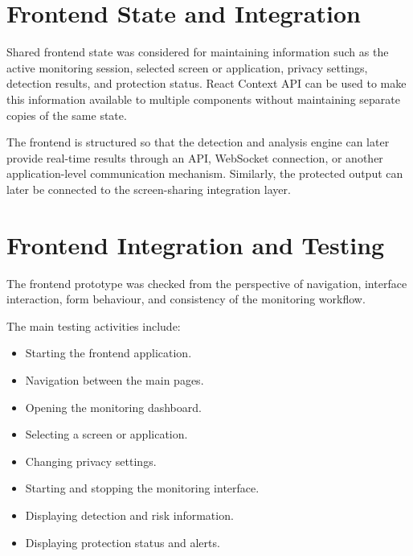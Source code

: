 \documentclass[12pt,a4paper]{article}
\begin{document}

\section{Frontend State and Integration}

Shared frontend state was considered for maintaining information such as the active
monitoring session, selected screen or application, privacy settings, detection results,
and protection status. React Context API can be used to make this information available
to multiple components without maintaining separate copies of the same state.

The frontend is structured so that the detection and analysis engine can later provide
real-time results through an API, WebSocket connection, or another application-level
communication mechanism. Similarly, the protected output can later be connected to
the screen-sharing integration layer.


\section{Frontend Integration and Testing}

The frontend prototype was checked from the perspective of navigation, interface
interaction, form behaviour, and consistency of the monitoring workflow.

The main testing activities include:

\begin{itemize}

    \item Starting the frontend application.

    \item Navigation between the main pages.

    \item Opening the monitoring dashboard.

    \item Selecting a screen or application.

    \item Changing privacy settings.

    \item Starting and stopping the monitoring interface.

    \item Displaying detection and risk information.

    \item Displaying protection status and alerts.

\end{itemize}
\end{document}
